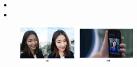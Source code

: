 \documentclass[notes,slidesec,a4]{seminar}
\begin{document}
\begin{hslide}
	\begin{minipage}{5cm}
		\begin{itemize}
			\item 
			\item 
		\end{itemize}
	\end{minipage} \hfill
	\begin{minipage}{6cm}
		\begin{center}
			\begin{figure}
				\includegraphics[width=6.0cm]{img/face.png}
			\end{figure}
		\end{center}

	\end{minipage}
\end{hslide}

\end{document}
